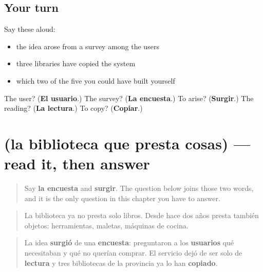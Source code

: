 \subsection*{Your turn}
Say these aloud:

\begin{itemize}
\raggedright
  \item the idea arose from a survey among the users
  \item three libraries have copied the system
  \item which two of the five you could have built yourself
\end{itemize}

\begin{tcolorbox}[breakable,colback=teal!4,colframe=teal!35!black,title={Before you move on}]
The user? (\textbf{El usuario}.) The survey? (\textbf{La encuesta}.) To arise? (\textbf{Surgir}.) The reading? (\textbf{La lectura}.) To copy? (\textbf{Copiar}.)
\end{tcolorbox}
\section[Practice]{(la biblioteca que presta cosas) — read it, then answer}

\label{lesson:ES-C472-sintesis-encuesta}



\begin{quote}
Say \textbf{la encuesta} and \textbf{surgir}. The question below joins those two words, and it is the only question in this chapter you have to answer.
\end{quote}

\begin{tcolorbox}[breakable,skin=enhanced,colback=orange!6,colframe=orange!45!black,boxrule=0.5pt,arc=1mm,left=6pt,right=6pt,top=4pt,bottom=4pt,fonttitle=\bfseries,title={Read this}]
\begin{quote}
La biblioteca ya no presta solo libros. Desde hace dos años presta también objetos: herramientas, maletas, máquinas de cocina.
\end{quote}

\begin{quote}
La idea \textbf{surgió} de una \textbf{encuesta}: preguntaron a los \textbf{usuarios} qué necesitaban y qué no querían comprar. El servicio dejó de ser solo de \textbf{lectura} y tres bibliotecas de la provincia ya lo han \textbf{copiado}.
\end{quote}
\end{tcolorbox}

